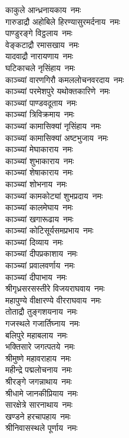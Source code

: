\begin{multicols}{2}
\begin{flushleft}
काकुले आन्ध्रनायकाय~नमः\\
गारुडाद्रौ अहोबिले हिरण्यासुरमर्दनाय~नमः\\
पाण्डुरङ्गे विट्ठलाय~नमः\\
वेङ्कटाद्रौ रमासखाय~नमः\hfill{}\\
यादवाद्रौ नारायणाय~नमः\\
घटिकाचले नृसिंहाय~नमः\\
काञ्च्यां वारणगिरौ कमललोचनवरदाय~नमः\\
काञ्च्यां परमेशपुरे यथोक्तकारिणे~नमः\\
काञ्च्यां पाण्डवदूताय~नमः\\
काञ्च्यां त्रिविक्रमाय~नमः\\
काञ्च्यां कामासिक्यां नृसिंहाय~नमः\\
काञ्च्यां कामासिक्यां अष्टभुजाय~नमः\\
काञ्च्यां मेघाकाराय~नमः\\
काञ्च्यां शुभाकाराय~नमः\hfill{}\\
काञ्च्यां शेषाकाराय~नमः\\
काञ्च्यां शोभनाय~नमः\\
काञ्च्यां कामकोट्यां शुभप्रदाय~नमः\\
काञ्च्यां कालमेघाय~नमः\\
काञ्च्यां खगारूढाय~नमः\\
काञ्च्यां कोटिसूर्यसमप्रभाय~नमः\\
काञ्च्यां दिव्याय~नमः\\
काञ्च्यां दीपप्रकाशाय~नमः\\
काञ्च्यां प्रवालवर्णाय~नमः\\
काञ्च्यां दीपाभाय~नमः\hfill{}\\
श्रीगृध्रसरसस्तीरे विजयराघवाय~नमः\\
महापुण्ये वीक्षारण्ये वीरराघवाय~नमः\\
तोताद्रौ तुङ्गशयनाय~नमः\\
गजस्थले गजार्तिघ्नाय~नमः\\
बलिपुरे महाबलाय~नमः\\
भक्तिसारे जगत्पतये~नमः\\
श्रीमुष्णे महावराहाय~नमः\\
महीन्द्रे पद्मलोचनाय~नमः\\
श्रीरङ्गे जगन्नाथाय~नमः\\
श्रीधामे जानकीप्रियाय~नमः\hfill{}\\
सारक्षेत्रे सारनाथाय~नमः\\
खण्डने हरचापहाय~नमः\\
श्रीनिवासस्थले पूर्णाय~नमः\\

\end{flushleft}
\end{multicols}
